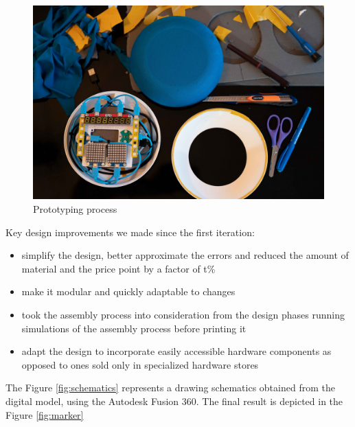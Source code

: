 \begin{figure}[htp]
    \centering
    \includegraphics[width = 14cm]{figures/prev_prototype}
    \caption{Prototyping process}
    \label{fig:prev}
\end{figure}

\vspace{4mm}
Key design improvements we made since the first iteration:
\begin{itemize}
    \item{simplify the design, better approximate the errors and reduced the amount of material and the price point by a factor of t\%}
    \item{make it modular and quickly adaptable to changes}
    \item{took the assembly process into consideration from the design phases running simulations of the assembly process before printing it}
    \item{adapt the design to incorporate easily accessible hardware components as opposed to ones sold only in specialized hardware stores}
\end{itemize}

The Figure \ref{fig:schematics} represents a drawing schematics obtained from the digital model, using the Autodesk Fusion 360. The final result is depicted in the Figure \ref{fig:marker}

